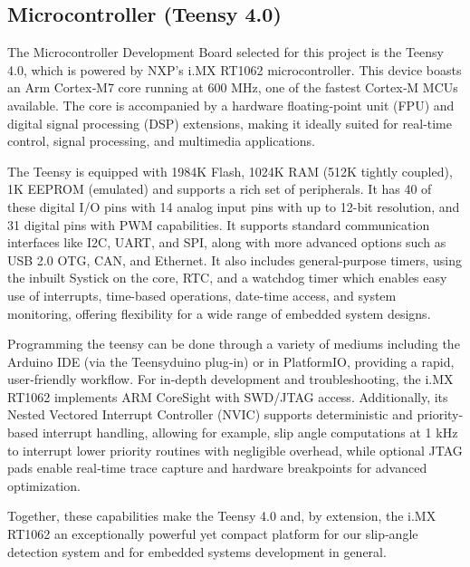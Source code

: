 \documentclass[12pt]{article}
\begin{document}
        
        \subsection{Microcontroller (Teensy 4.0)}

            The Microcontroller Development Board selected for this project is the Teensy 4.0, which is powered by NXP’s i.MX RT1062 
            microcontroller. This device boasts an Arm Cortex‑M7 core running at 600 MHz, one of the fastest Cortex‑M MCUs available. 
            The core is accompanied by a hardware floating‑point unit (FPU) and digital signal processing (DSP) extensions, making it 
            ideally suited for real‑time control, signal processing, and multimedia applications. 

            The Teensy is equipped with 1984K Flash, 1024K RAM (512K tightly coupled), 1K EEPROM (emulated) and supports a rich set of 
            peripherals. It has 40 of these digital I/O pins with 14 analog input pins with up to 12-bit resolution, and 31 digital pins 
            with PWM capabilities. It supports standard communication interfaces like I2C, UART, and SPI, along with more advanced options 
            such as USB 2.0 OTG, CAN, and Ethernet. It also includes general-purpose timers, using the inbuilt Systick on the core, RTC, and 
            a watchdog timer which enables easy use of interrupts, time-based operations, date-time access, and system monitoring, offering 
            flexibility for a wide range of embedded system designs.

            Programming the teensy can be done through a variety of mediums including the Arduino IDE (via the Teensyduino plug‑in) or in 
            PlatformIO, providing a rapid, user‑friendly workflow. For in‑depth development and troubleshooting, the i.MX RT1062 implements 
            ARM CoreSight with SWD/JTAG access. Additionally, its Nested Vectored Interrupt Controller (NVIC) supports deterministic and 
            priority-based interrupt handling, allowing for example, slip angle computations at 1 kHz to interrupt lower priority routines with 
            negligible overhead, while optional JTAG pads enable real‑time trace capture and hardware breakpoints for advanced optimization. 

            Together, these capabilities make the Teensy 4.0 and, by extension, the i.MX RT1062 an exceptionally powerful yet compact platform 
            for our slip‑angle detection system and for embedded systems development in general. 
\end{document}
